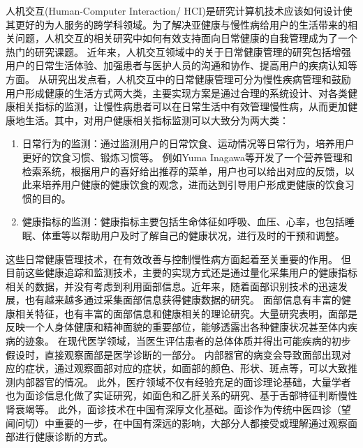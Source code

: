 人机交互(Human-Computer Interaction/ HCI)是研究计算机技术应该如何设计使其更好的为人服务的跨学科领域。为了解决亚健康与慢性病给用户的生活带来的相关问题，人机交互的相关研究中如何有效支持面向日常健康的自我管理成为了一个热门的研究课题。
近年来，人机交互领域中的关于日常健康管理的研究包括增强用户的日常生活体验、加强患者与医护人员的沟通和协作、提高用户的疾病认知等方面。
从研究出发点看，人机交互中的日常健康管理可分为慢性疾病管理和鼓励用户形成健康的生活方式两大类，主要实现方案是通过合理的系统设计、对各类健康相关指标的监测，让慢性病患者可以在日常生活中有效管理慢性病，从而更加健康地生活。其中，对用户健康相关指标监测可以大致分为两大类：
\begin{enumerate}
    \item 日常行为的监测：通过监测用户的日常饮食、运动情况等日常行为，培养用户更好的饮食习惯、锻炼习惯等\cite{purpura2011fit4life,Inagawa2013A,cordeiro2015barriers, miller2014stepstream}。 例如Yuma Inagawa等\cite{Inagawa2013A}开发了一个营养管理和检索系统，根据用户的喜好给出推荐的菜单，用户也可以给出对应的反馈，以此来培养用户健康的健康饮食的观念，进而达到引导用户形成更健康的饮食习惯的目的。
    \item 健康指标的监测：健康指标主要包括生命体征如呼吸、血压、心率，也包括睡眠、体重等以帮助用户及时了解自己的健康状况，进行及时的干预和调整\cite{kay2012lullaby,gronvall2013beyond,walters2010a}。
\end{enumerate}

这些日常健康管理技术，在有效改善与控制慢性病方面起着至关重要的作用\cite{ayobi2017quantifying}。
但目前这些健康追踪和监测技术，主要的实现方式还是通过量化采集用户的健康指标相关的数据，并没有考虑到利用面部信息。近年来，随着面部识别技术的迅速发展，也有越来越多通过采集面部信息获得健康数据的研究。
面部信息有丰富的健康相关特征，也有丰富的面部信息和健康相关的理论研究。大量研究表明，面部是反映一个人身体健康和精神面貌的重要部位，能够透露出各种健康状况甚至体内疾病的迹象。
在现代医学领域，当医生评估患者的总体体质并得出可能疾病的初步假设时，直接观察面部是医学诊断的一部分\cite{ding2019reading}。
内部器官的病变会导致面部出现对应的症状，通过观察面部对应的症状，如面部的颜色、形状、斑点等，可以大致推测内部器官的情况\cite{汪珺2018六经辨证中自然辩证法三大规律初探}。
此外，医疗领域不仅有经验充足的面诊理论基础，大量学者也为面诊信息化做了实证研究，如面色和乙肝关系的研究\cite{吴秀艳2014108}、基于舌部特征判断慢性肾衰竭\cite{周小芳2018慢性肾衰患者虚兼湿浊证的口唇特征研究}等。
此外，面诊技术在中国有深厚文化基础。面诊作为传统中医四诊（望闻问切）中重要的一步，在中国有深远的影响，大部分人都接受或理解通过观察面部进行健康诊断的方式。

